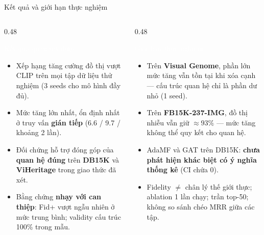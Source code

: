 \documentclass[aspectratio=169,10pt]{beamer}
\begin{document}
\begin{frame}{Kết quả và giới hạn thực nghiệm}
  \begin{columns}[t]
    \begin{column}{0.48\textwidth}
      \begin{block}{\textcolor{white}{Kết quả quan sát được}}\footnotesize
        \begin{itemize}
          \item Xếp hạng tăng cường đồ thị vượt CLIP trên mọi tập dữ liệu thử nghiệm (3 seeds cho mô hình đầy đủ).
          \item Mức tăng lớn nhất, ổn định nhất ở truy vấn \textbf{gián tiếp} (6.6 / 9.7 / khoảng 2 lần).
          \item Đối chứng hỗ trợ đóng góp của \textbf{quan hệ đúng} trên \textbf{DB15K} và \textbf{ViHeritage} trong giao thức đã xét.
          \item Bằng chứng \textbf{nhạy với can thiệp}: Fid+ vượt ngẫu nhiên ở mức trung bình; validity cấu trúc 100\% trong mẫu.
        \end{itemize}
      \end{block}
    \end{column}
    \begin{column}{0.48\textwidth}
      \begin{alertblock}{\textcolor{white}{Giới hạn thực nghiệm}}\footnotesize
        \begin{itemize}
          \item Trên \textbf{Visual Genome}, phần lớn mức tăng vẫn tồn tại khi xóa cạnh --- cấu trúc quan hệ chỉ là phần dư nhỏ (1 seed).
          \item Trên \textbf{FB15K-237-IMG}, đồ thị nhiễu vẫn giữ ${\approx}93\%$ --- mức tăng không thể quy kết cho quan hệ.
          \item AdaMF và GAT trên DB15K: \textbf{chưa phát hiện khác biệt có ý nghĩa thống kê} (CI chứa 0).
          \item Fidelity $\ne$ chân lý thế giới thực; ablation 1 lần chạy; trần top-50; không so sánh chéo MRR giữa các tập.
        \end{itemize}
      \end{alertblock}
    \end{column}
  \end{columns}

\end{frame}
\end{document}
